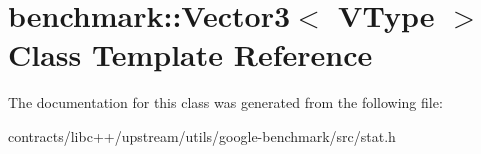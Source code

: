 \hypertarget{classbenchmark_1_1_vector3}{}\section{benchmark\+:\+:Vector3$<$ V\+Type $>$ Class Template Reference}
\label{classbenchmark_1_1_vector3}


The documentation for this class was generated from the following file\+:\begin{DoxyCompactItemize}
\item 
contracts/libc++/upstream/utils/google-\/benchmark/src/stat.\+h\end{DoxyCompactItemize}
